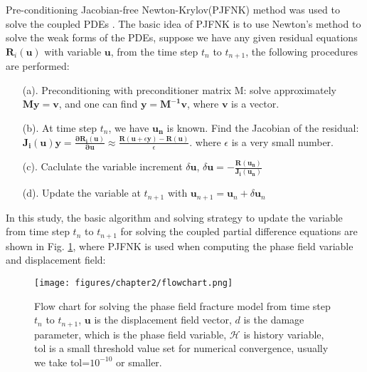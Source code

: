 \documentclass[3p,10pt,sort&compress]{elsarticle}
\begin{document}
Pre-conditioning Jacobian-free Newton-Krylov(PJFNK) method was used to solve the coupled PDEs \cite{knoll2004jacobian}. The basic idea of PJFNK is to use Newton's method to solve the weak forms of the PDEs, suppose we have any given residual equations $\boldsymbol{R}_i(\boldsymbol{u})$ with variable $\boldsymbol{u}$, from the time step $t_n$ to $t_{n+1}$, the following procedures are performed:
\begin{enumerate}
	\item[(a).] Preconditioning with preconditioner matrix M: solve approximately $\boldsymbol{My=v}$, and one can find $\boldsymbol{y=M^{-1}v}$, where $\boldsymbol{v}$ is a vector.
    \item[(b).] At time step $t_n$, we have $\boldsymbol{u_n}$ is known. Find the Jacobian of the residual: $\boldsymbol{J_i(u)y} = \boldsymbol{\frac{\partial R_i(u)}{\partial u}} \approx \frac{\boldsymbol{R}(\boldsymbol{u} + \epsilon \boldsymbol{y})-\boldsymbol{R(u)} }{\epsilon}$. where $\epsilon$ is a very small number.
    \item[(c).] Caclulate the variable increment $\delta \boldsymbol{u}$, $\delta \boldsymbol{u} = - \frac{\boldsymbol{R(u_n)}}{\boldsymbol{J_i(u_n)}}$
    \item[(d).] Update the variable at $t_{n+1}$ with $\boldsymbol{u}_{n+1} = \boldsymbol{u}_{n} + \delta \boldsymbol{u}_n$
\end{enumerate}


In this study, the basic algorithm and solving strategy to update the variable from time step $t_n$ to $t_{n+1}$ for solving the coupled partial difference equations are shown in Fig. \ref{fig:flowchart}, where PJFNK is used when computing the phase field variable and displacement field:
\begin{figure}[!htb]
  \begin{center}
    \texttt{[image: figures/chapter2/flowchart.png]}
    \caption{Flow chart for solving the phase field fracture model from time step $t_n$ to $t_{n+1}$, $\boldsymbol{u}$ is the displacement field vector, $d$ is the damage parameter, which is the phase field variable, $\mathcal{H}$ is history variable, tol is a small threshold value set for numerical convergence, usually we take tol=$10^{-10}$ or smaller.}
    \label{fig:flowchart}
  \end{center}
\end{figure}

\end{document}
